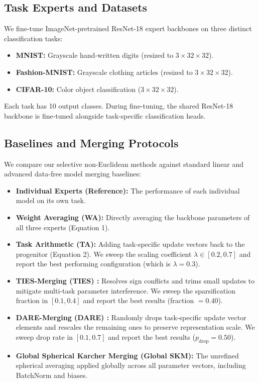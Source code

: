 \documentclass{article}
\begin{document}
\subsection{Task Experts and Datasets}
We fine-tune ImageNet-pretrained ResNet-18 expert backbones on three distinct classification tasks:
\begin{itemize}
  \item \textbf{MNIST:} Grayscale hand-written digits (resized to $3 \times 32 \times 32$).
  \item \textbf{Fashion-MNIST:} Grayscale clothing articles (resized to $3 \times 32 \times 32$).
  \item \textbf{CIFAR-10:} Color object classification ($3 \times 32 \times 32$).
\end{itemize}
Each task has 10 output classes. During fine-tuning, the shared ResNet-18 backbone is fine-tuned alongside task-specific classification heads.

\subsection{Baselines and Merging Protocols}
We compare our selective non-Euclidean methods against standard linear and advanced data-free model merging baselines:
\begin{itemize}
  \item \textbf{Individual Experts (Reference):} The performance of each individual model on its own task.
  \item \textbf{Weight Averaging (WA):} Directly averaging the backbone parameters of all three experts (Equation 1).
  \item \textbf{Task Arithmetic (TA):} Adding task-specific update vectors back to the progenitor (Equation 2). We sweep the scaling coefficient $\lambda \in [0.2, 0.7]$ and report the best performing configuration (which is $\lambda = 0.3$).
  \item \textbf{TIES-Merging (TIES) \cite{yadav2023ties}:} Resolves sign conflicts and trims small updates to mitigate multi-task parameter interference. We sweep the sparsification fraction in $[0.1, 0.4]$ and report the best results (fraction $= 0.40$).
  \item \textbf{DARE-Merging (DARE) \cite{yu2024dare}:} Randomly drops task-specific update vector elements and rescales the remaining ones to preserve representation scale. We sweep drop rate in $[0.1, 0.7]$ and report the best results ($p_{\text{drop}} = 0.50$).
  \item \textbf{Global Spherical Karcher Merging (Global SKM):} The unrefined spherical averaging applied globally across all parameter vectors, including BatchNorm and biases.
\end{itemize}
\end{document}
